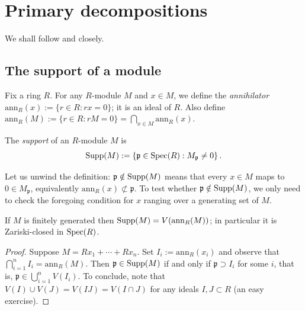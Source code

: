 
\chapter{Primary decompositions}

We shall follow \cite[\S 3]{Eis95} and \cite[\S 8]{Mat80} closely.

\section{The support of a module}
Fix a ring $R$. For any $R$-module $M$ and $x \in M$, we define the \emph{annihilator} $\text{ann}_R(x) := \{ r \in R: rx=0 \}$; it is an ideal of $R$. Also define $\text{ann}_R(M) := \{r \in R: rM=0 \} = \bigcap_{x \in M} \text{ann}_R(x)$. 

\begin{definition}
	The \emph{support} of an $R$-module $M$ is
	\[ \operatorname{Supp}(M) := \left\{ \mathfrak{p} \in \operatorname{Spec}(R): M_{\mathfrak{p}} \neq 0 \right\}. \]
\end{definition}
Let us unwind the definition: $\mathfrak{p} \notin \operatorname{Supp}(M)$ means that every $x \in M$ maps to $0 \in M_{\mathfrak{p}}$, equivalently $\text{ann}_R(x) \not\subset \mathfrak{p}$. To test whether $\mathfrak{p} \notin \operatorname{Supp}(M)$, we only need to check the foregoing condition for $x$ ranging over a generating set of $M$.

\begin{proposition}
	If $M$ is finitely generated then $\operatorname{Supp}(M) = V(\mathrm{ann}_R(M))$; in particular it is Zariski-closed in $\operatorname{Spec}(R)$.
\end{proposition}
\begin{proof}
	Suppose $M = Rx_1 + \cdots + Rx_n$. Set $I_i := \text{ann}_R(x_i)$ and observe that $\bigcap_{i=1}^n I_i = \text{ann}_R(M)$. Then $\mathfrak{p} \in \operatorname{Supp}(M)$ if and only if $\mathfrak{p} \supset I_i$ for some $i$, that is, $\mathfrak{p} \in \bigcup_{i=1}^n V(I_i)$. To conclude, note that $V(I) \cup V(J) = V(IJ) = V(I \cap J)$ for any ideals $I, J \subset R$ (an easy exercise).
\end{proof}

